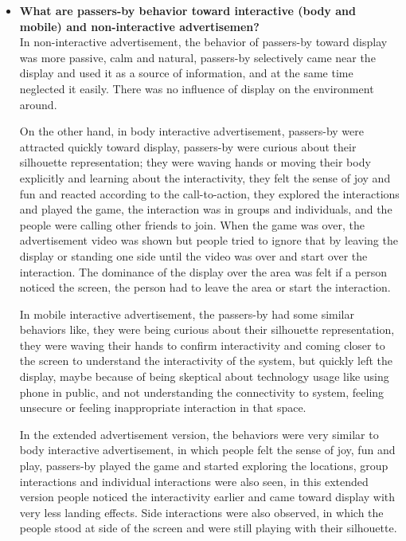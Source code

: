 \begin{itemize}

\item \textbf{What are passers-by behavior toward interactive (body and mobile) and non-interactive advertisemen?} \\
In non-interactive advertisement, the behavior of passers-by toward display was more passive, calm and natural, passers-by selectively came near the display and used it as a source of information, and at the same time neglected it easily. There was no influence of display on the environment around.

On the other hand, in body interactive advertisement, passers-by were attracted quickly toward display, passers-by were curious about their silhouette representation; they were waving hands or moving their body explicitly and learning about the interactivity, they felt the sense of joy and fun and reacted according to the call-to-action, they explored the interactions and played the game, the interaction was in groups and individuals, and the people were calling other friends to join. When the game was over, the advertisement video was shown but people tried to ignore that by leaving the display or standing one side until the video was over and start over the interaction. The dominance of the display over the area was felt if a person noticed the screen, the person had to leave the area or start the interaction. 

In mobile interactive advertisement, the passers-by had some similar behaviors like, they were being curious about their silhouette representation, they were waving their hands to confirm interactivity and coming closer to the screen to understand the interactivity of the system, but quickly left the display, maybe because of being skeptical about technology usage like using phone in public, and not understanding the connectivity to system, feeling unsecure or feeling inappropriate interaction in that space.

In the extended advertisement version, the behaviors were very similar to body interactive advertisement, in which people felt the sense of joy, fun and play, passers-by played the game and started exploring the locations, group interactions and individual interactions were also seen, in this extended version people noticed the interactivity earlier and came toward display with very less landing effects. Side interactions were also observed, in which the people stood at side of the screen and were still playing with their silhouette.

 
\end{itemize}

